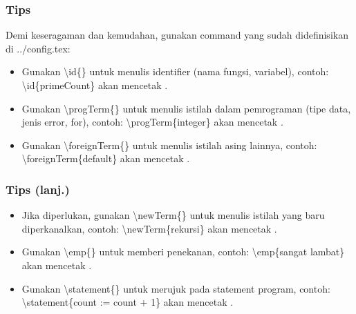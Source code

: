 \begin{frame}
\frametitle{Tips}
Demi keseragaman dan kemudahan, gunakan command yang sudah didefinisikan di ../config.tex:
\begin{itemize}
  \item Gunakan \textbackslash id\{\} untuk menulis identifier (nama fungsi, variabel), contoh: \textbackslash id\{primeCount\} akan mencetak .
  \item Gunakan \textbackslash progTerm\{\} untuk menulis istilah dalam pemrograman (tipe data, jenis error, for), contoh: \textbackslash progTerm\{integer\} akan mencetak .
  \item Gunakan \textbackslash foreignTerm\{\} untuk menulis istilah asing lainnya, contoh: \textbackslash foreignTerm\{default\} akan mencetak .
\end{itemize}
\end{frame}

\begin{frame}
\frametitle{Tips (lanj.)}
\begin{itemize}
  \item Jika diperlukan, gunakan \textbackslash newTerm\{\} untuk menulis istilah yang baru diperkanalkan, contoh: \textbackslash newTerm\{rekursi\} akan mencetak .
  \item Gunakan \textbackslash emp\{\} untuk memberi penekanan, contoh: \textbackslash emp\{sangat lambat\} akan mencetak .
  \item Gunakan \textbackslash statement\{\} untuk merujuk pada statement program, contoh: \textbackslash statement\{count := count + 1\} akan mencetak .
\end{itemize}
\end{frame}


